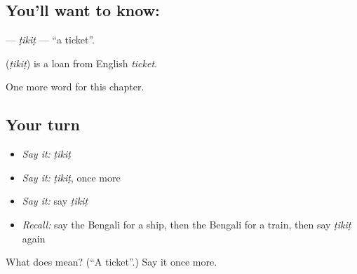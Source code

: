 \subsection*{You'll want to know: }
\textbf{} — \emph{ṭikiṭ} — \textquotedblleft{}a ticket\textquotedblright{}.

\begin{cousinweb}
\textbf{} (\emph{ṭikiṭ}) is a loan from English \emph{ticket}.
\end{cousinweb}

\begin{grammarlens}[title={What you've built}]
One more word for this chapter.
\end{grammarlens}

\subsection*{Your turn}
\begin{itemize}
\raggedright
  \item \emph{Say it:} \emph{ṭikiṭ}
  \item \emph{Say it:} \emph{ṭikiṭ}, once more
  \item \emph{Say it:} say \emph{ṭikiṭ}
  \item \emph{Recall:} say the Bengali for a ship, then the Bengali for a train, then say \emph{ṭikiṭ} again
\end{itemize}

\begin{tcolorbox}[breakable,colback=teal!4,colframe=teal!35!black,title={Before you move on}]
What does  mean? (\textquotedblleft{}A ticket\textquotedblright{}.) Say it once more.
\end{tcolorbox}
